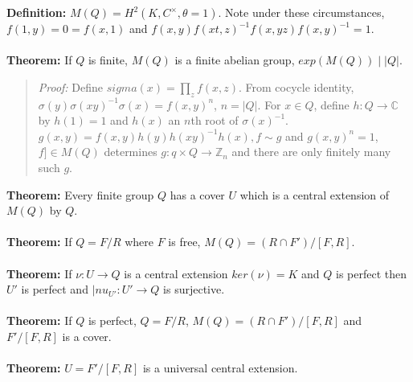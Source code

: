 {\bf Definition:} $M(Q)= H^2(K,C^{\times}, \theta = 1)$.  Note under these circumstances,
$f(1,y)= 0 = f(x,1)$ and $f(x,y)f(xt,z)^{-1}f(x,yz) f(x,y)^{-1}=1$.
\\
\\
{\bf Theorem:} If $Q$ is finite, $M(Q)$ is a finite abelian group, $exp(M(Q)) \mid |Q|$.
\begin{quote}
\emph{Proof:}
Define $sigma(x) = \prod_z f(x,z)$.  From cocycle identity,
$\sigma(y)\sigma(xy)^{-1}\sigma(x) = f(x,y)^n$, $n = |Q|$.
For $x \in Q$, define $h:Q \rightarrow {\mathbb C}$ by $h(1)=1$ and $h(x)$ an $n$th root of $\sigma(x)^{-1}$.
$g(x,y)=f(x,y)h(y)h(xy)^{-1}h(x), f \sim g$ and $g(x,y)^n =1$, $f] \in M(Q)$ determines
$g: q \times Q \rightarrow {\mathbb Z}_n$ and there are only finitely many such $g$.
\end{quote}
{\bf Theorem:} Every finite group $Q$ has a cover $U$ which is a central extension of $M(Q)$ by $Q$.
\\
\\
{\bf Theorem:} If $Q=F/R$ where $F$ is free, $M(Q)= (R \cap F')/[F,R]$.
\\
\\
{\bf Theorem:} If $\nu: U \rightarrow Q$ is a central extension $ker(\nu)=K$ and $Q$ is perfect then
$U'$ is perfect and $|nu_{U'}: U' \rightarrow Q$ is surjective.
\\
\\
{\bf Theorem:} If $Q$ is perfect, $Q=F/R$, $M(Q)= (R \cap F')/[F,R]$ and $F'/[F,R]$ is a cover.
\\
\\
{\bf Theorem:} $U = F'/[F,R]$ is a universal central extension.
